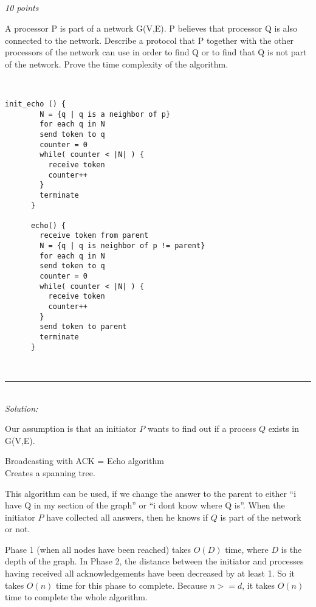 \documentclass[a4paper]{article}
\newcommand{\horrule}[1]{\rule{\linewidth}{#1}} %
\newcommand{\points}[1]{\subsection{} \textit{#1 points}\\}
\newcommand{\question}[2][]{
  \noindent
  \parbox[t]{\textwidth}{#1 \parbox[t]{0.95\textwidth}{#2}}\\
}
\newcommand{\solution}[1]{\\\horrule{0.5pt}\\[3pt]\textit{Solution: }\\[0.1cm]\begin{minipage}{\textwidth}#1\end{minipage}}
\begin{document}
\points{10}
\question{
  A processor P is part of a network G(V,E). P believes that processor
  Q is also connected to the network. Describe a protocol that P
  together with the other processors of the network can use in order to
  find Q or to find that Q is not part of the network. Prove the time
  complexity of the algorithm.
}
%
\begin{lrbox}{\userinput}
  \begin{minipage}{\linewidth}
    \begin{lstlisting}[mathescape]
      init_echo () {
        N = {q | q is a neighbor of p}
        for each q in N
        send token to q
        counter = 0
        while( counter < |N| ) {
          receive token
          counter++
        }
        terminate
      }

      echo() {
        receive token from parent
        N = {q | q is neighbor of p != parent}
        for each q in N
        send token to q
        counter = 0
        while( counter < |N| ) {
          receive token
          counter++
        }
        send token to parent
        terminate
      }
    \end{lstlisting}
  \end{minipage}
\end{lrbox}
%
\solution{
  Our assumption is that an initiator $P$ wants to find out if a
  process $Q$ exists in G(V,E).


  Broadcasting with ACK = Echo algorithm\\
  Creates a spanning tree.

  \usebox{\userinput}

  This algorithm can be used, if we change the answer to the parent to
  either ``i have Q in my section of the graph'' or ``i dont know
  where Q is''.
  When the initiator $P$ have collected all answers, then he knows if
  $Q$ is part of the network or not.

  Phase 1 (when all nodes have been reached) takes $O(D)$ time, where
  $D$ is the depth of the graph. In Phase 2, the distance between the 
  initiator and processes having received all acknowledgements have been 
  decreased by at least 1. So it takes $O(n)$ time for this phase to complete.
  Because $ n >= d $, it takes $O(n)$ time to complete the whole
  algorithm.
}
\end{document}
